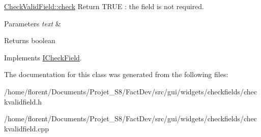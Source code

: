 \hyperlink{classCheckValidField_a192b1c9c84ea8897661425fd3c0b9e8e}{Check\-Valid\-Field\-::check} Return T\-R\-U\-E \-: the field is not required. 


\begin{DoxyParams}{Parameters}
{\em text} & \\
\hline
\end{DoxyParams}
\begin{DoxyReturn}{Returns}
boolean 
\end{DoxyReturn}


Implements \hyperlink{classICheckField_a6bd42b4d49c165cdd92822135123fd4b}{I\-Check\-Field}.



The documentation for this class was generated from the following files\-:\begin{DoxyCompactItemize}
\item 
/home/florent/\-Documents/\-Projet\-\_\-\-S8/\-Fact\-Dev/src/gui/widgets/checkfields/checkvalidfield.\-h\item 
/home/florent/\-Documents/\-Projet\-\_\-\-S8/\-Fact\-Dev/src/gui/widgets/checkfields/checkvalidfield.\-cpp\end{DoxyCompactItemize}
